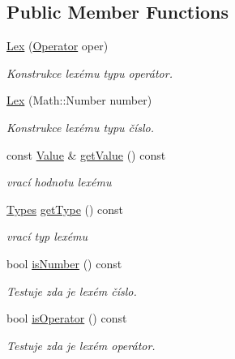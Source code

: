 \subsection*{Public Member Functions}
\begin{DoxyCompactItemize}
\item 
\hyperlink{classteam22_1_1_calc_1_1_lex_a12b6acfadebf09ce47319315f8a2e684}{Lex} (\hyperlink{classteam22_1_1_calc_1_1_lex_a61d29fc4878a3b36d2de2f13c56ed932}{Operator} oper)
\begin{DoxyCompactList}\small\item\em Konstrukce lexému typu operátor. \end{DoxyCompactList}\item 
\hyperlink{classteam22_1_1_calc_1_1_lex_a95deefe4c4e987fef602fbd621bac095}{Lex} (Math\+::\+Number number)
\begin{DoxyCompactList}\small\item\em Konstrukce lexému typu číslo. \end{DoxyCompactList}\item 
const \hyperlink{unionteam22_1_1_calc_1_1_lex_1_1_value}{Value} \& \hyperlink{classteam22_1_1_calc_1_1_lex_a8a68cd13a68d32d50d3b014ca4478fab}{get\+Value} () const
\begin{DoxyCompactList}\small\item\em vrací hodnotu lexému \end{DoxyCompactList}\item 
\hyperlink{classteam22_1_1_calc_1_1_lex_a295984577c98a23ddd20ee36d33145a2}{Types} \hyperlink{classteam22_1_1_calc_1_1_lex_ae82ccde78beed14c45df1e747ed21bcb}{get\+Type} () const
\begin{DoxyCompactList}\small\item\em vrací typ lexému \end{DoxyCompactList}\item 
bool \hyperlink{classteam22_1_1_calc_1_1_lex_a21f9fe1956185bfb6d80d094846a44f1}{is\+Number} () const
\begin{DoxyCompactList}\small\item\em Testuje zda je lexém číslo. \end{DoxyCompactList}\item 
bool \hyperlink{classteam22_1_1_calc_1_1_lex_a965eff3f3264440279ea9a1f1d3a3cfe}{is\+Operator} () const
\begin{DoxyCompactList}\small\item\em Testuje zda je lexém operátor. \end{DoxyCompactList}\item 

\end{DoxyCompactItemize}
